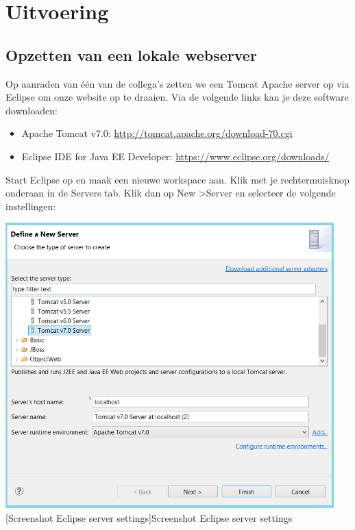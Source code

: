 \chapter[Uitvoering]{Uitvoering}
\label{chap_uitvoering}

\section{Opzetten van een lokale webserver}
Op aanraden van \'{e}\'{e}n van de collega's zetten we een Tomcat Apache server op via Eclipse om onze website op te draaien. Via de volgende links kan je deze software downloaden:
\begin{itemize}
\item Apache Tomcat v7.0: \url{http://tomcat.apache.org/download-70.cgi}
\item Eclipse IDE for Java EE Developer:  \url{https://www.eclipse.org/downloads/}
\end{itemize} 
Start Eclipse op en maak een nieuwe workspace aan. Klik met je rechtermuisknop onderaan in de Servers tab. Klik dan op New \textgreater Server en selecteer de volgende instellingen:
\begin{center}
  \includegraphics[width=0.95\textwidth]{figures/chap2/eclipse1.png}
  [Screenshot Eclipse server settings]{Screenshot Eclipse server settings
  \label{fig_eclipse1}}
\end{center}

